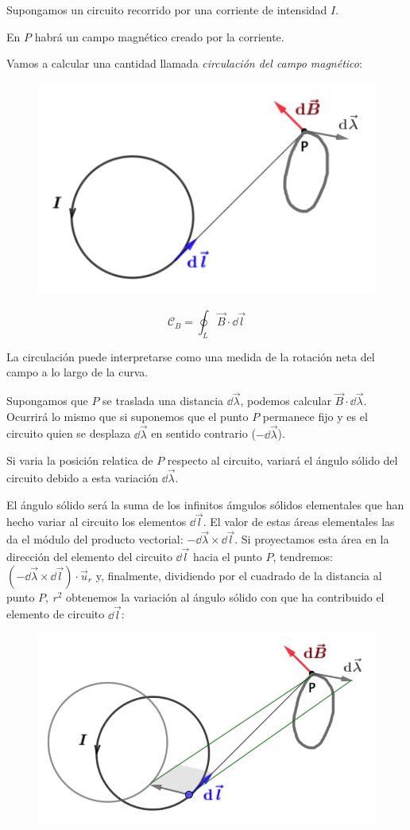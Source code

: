 \begin{multicols}{2}
Supongamos un circuito recorrido por una corriente de intensidad $I$.

En $P$ habrá un campo magnético creado por la corriente.

Vamos a calcular una cantidad llamada \emph{circulación del campo magnético}:
\begin{figure}[H]
	\centering
	\includegraphics[width=.4\textwidth]{imagenes/imagenes27/T27IM01.png}
\end{figure}	
\end{multicols}
$$\mathcal C_B=\displaystyle \oint_L \vec B \cdot \dd \vec l$$

La circulación puede interpretarse como una medida de la rotación neta del campo a lo largo de la curva.

Supongamos que $P$ se traslada una distancia $\dd \vec \lambda$, podemos calcular $\vec B \cdot \dd \vec \lambda$. Ocurrirá lo mismo que si suponemos que el punto $P$ permanece fijo y es el circuito quien se desplaza $\dd \vec \lambda$ en sentido contrario ($-\dd \vec \lambda$).

Si varia la posición relatica de $P$ respecto al circuito, variará el ángulo sólido del circuito debido a esta variación $\dd \vec \lambda$.

\begin{multicols}{2}
	El ángulo sólido será la suma de los infinitos ámgulos sólidos elementales que han hecho variar al circuito los elementos $\dd \vec l$. El valor de estas áreas elementales las da el módulo del producto vectorial: $-\dd \vec \lambda \times  \dd \vec l$. Si proyectamos esta área en la dirección del elemento del circuito $\dd \vec l$ hacia el punto $P$, tendremos: $(-\dd \vec \lambda \times  \dd \vec l)\cdot \vec u_r$ y, finalmente, dividiendo por el cuadrado de la distancia al punto $P,\ r^2$ obtenemos la variación al ángulo sólido con que ha contribuido el elemento de circuito $\dd \vec l$:
\begin{figure}[H]
	\centering
	\includegraphics[width=.5\textwidth]{imagenes/imagenes27/T27IM02.png}
\end{figure}
\end{multicols}

